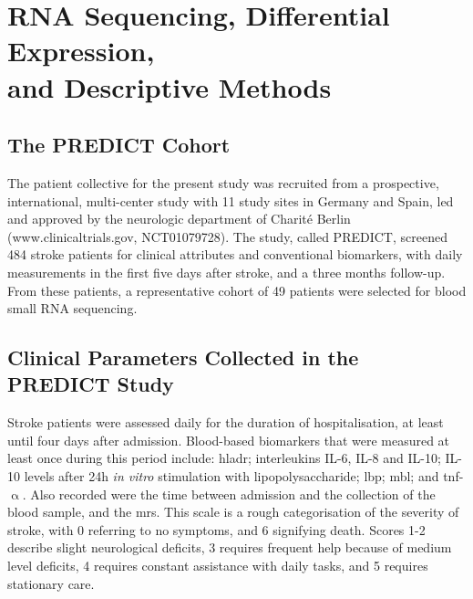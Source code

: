 \section[RNA Sequencing, Differential Expression, and Descriptive Methods]{RNA Sequencing, Differential Expression, \\and Descriptive Methods} \label{sec:stroke:descriptive-methods}

\begin{method}

\subsection{The PREDICT Cohort}
The patient collective for the present study was recruited from a prospective, international, multi-center study with 11 study sites in Germany and Spain, led and approved by the neurologic department of Charité Berlin (www.clinicaltrials.gov, NCT01079728).\cite{Hoffmann2017} The study, called PREDICT, screened 484 stroke patients for clinical attributes and conventional biomarkers, with daily measurements in the first five days after stroke, and a three months follow-up. From these patients, a representative cohort of 49 patients were selected for blood small RNA sequencing. 

\subsection{Clinical Parameters Collected in the PREDICT Study}
Stroke patients were assessed daily for the duration of hospitalisation, at least until four days after admission. Blood-based biomarkers that were measured at least once during this period include: \ac{hladr}; interleukins IL-6, IL-8 and IL-10; IL-10 levels after 24h \emph{in vitro} stimulation with lipopolysaccharide; \ac{lbp}; \ac{mbl}; and \ac{tnf}-$\upalpha$. Also recorded were the time between admission and the collection of the blood sample, and the \ac{mrs}. This scale is a rough categorisation of the severity of stroke, with 0 referring to no symptoms, and 6 signifying death. Scores 1-2 describe slight neurological deficits, 3 requires frequent help because of medium level deficits, 4 requires constant assistance with daily tasks, and 5 requires stationary care.


\end{method}

